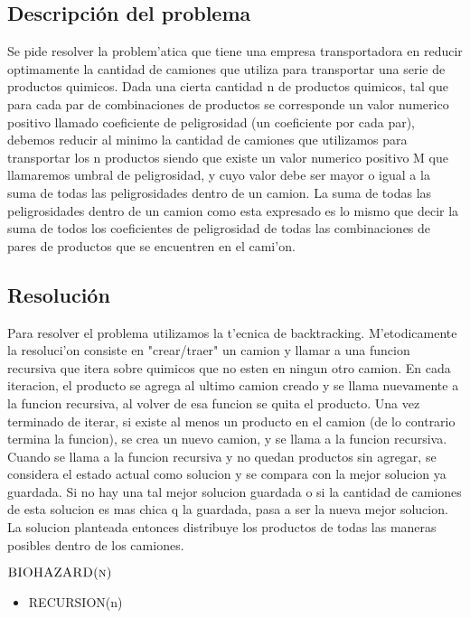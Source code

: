 \subsection{Descripci\'on del problema}

Se pide resolver la problem'atica que tiene una empresa transportadora en reducir optimamente la cantidad de camiones que utiliza para transportar una serie de productos quimicos. 
Dada una cierta cantidad n de productos quimicos, tal que para cada par de combinaciones de productos se corresponde un valor numerico positivo llamado coeficiente de peligrosidad (un coeficiente por cada par), debemos reducir al minimo la cantidad de camiones que utilizamos para transportar los n productos siendo que existe un valor numerico positivo M que llamaremos umbral de peligrosidad, y cuyo valor debe ser mayor o igual a la suma de todas las peligrosidades dentro de un camion. La suma de todas las peligrosidades dentro de un camion como esta expresado es lo mismo que decir la suma de todos los coeficientes de peligrosidad de todas las combinaciones de pares de productos que se encuentren en el cami'on.

\subsection{Resoluci\'on}

Para resolver el problema utilizamos la t'ecnica de backtracking. 
M'etodicamente la resoluci'on consiste en "crear/traer" un camion y llamar a una funcion recursiva que itera sobre quimicos que no esten en ningun otro camion. En cada iteracion, el producto se agrega al ultimo camion creado y se llama nuevamente a la funcion recursiva, al volver de esa funcion se quita el producto. Una vez terminado de iterar, si existe al menos un producto en el camion (de lo contrario termina la funcion), se crea un nuevo camion, y se llama a la funcion recursiva.
Cuando se llama a la funcion recursiva y no quedan productos sin agregar, se considera el estado actual como solucion y se compara con la mejor solucion ya guardada. Si no hay una tal mejor solucion guardada o si la cantidad de camiones de esta solucion es mas chica q la guardada, pasa a ser la nueva mejor solucion.
La solucion planteada entonces distribuye los productos de todas las maneras posibles dentro de los camiones. 


$\textnormal{\scshape BIOHAZARD(n)}$
\begin{itemize}
	\item RECURSION(n)		
\end{itemize} 

